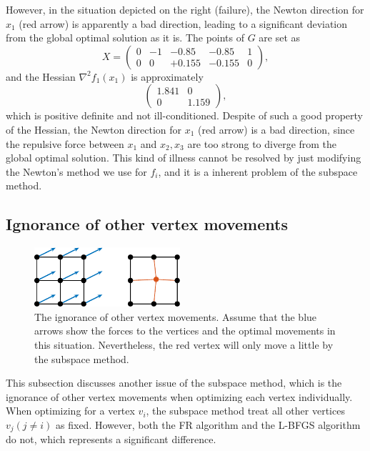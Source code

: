 \documentclass[dvipdfmx,10pt,journal,compsoc]{IEEEtran}
\begin{document}
However, in the situation depicted on the right (failure), the Newton direction for $x_1$ (red arrow) is apparently a bad direction, leading to a significant deviation from the global optimal solution as it is.
The points of $G$ are set as
\begin{equation*}
    X = \begin{pmatrix}
        0 & -1 & -0.85  & -0.85  & 1 \\
        0 & 0  & +0.155 & -0.155 & 0
    \end{pmatrix},
\end{equation*}
and the Hessian $\nabla^2 f_1(x_1)$ is approximately
\begin{equation*}
    \begin{pmatrix}
        1.841 & 0     \\
        0     & 1.159
    \end{pmatrix},
\end{equation*}
which is positive definite and not ill-conditioned.
Despite of such a good property of the Hessian, the Newton direction for $x_1$ (red arrow) is a bad direction, since the repulsive force between $x_1$ and $x_2,x_3$ are too strong to diverge from the global optimal solution.
This kind of illness cannot be resolved by just modifying the Newton's method we use for $f_i$, and it is a inherent problem of the subspace method.

\subsection{Ignorance of other vertex movements}\label{ssec:ignorance}

\begin{figure}[t]
    \centering
    \includegraphics[height=2.2cm]{whyRSNfail2/whyRSNfail2.pdf}
    \caption{
        The ignorance of other vertex movements. Assume that the blue arrows show the forces to the vertices and the optimal movements in this situation. Nevertheless, the red vertex will only move a little by the subspace method.
    }
    \label{fig:whyRSNfail2}
\end{figure}

This subsection discusses another issue of the subspace method, which is the ignorance of other vertex movements when optimizing each vertex individually.
When optimizing for a vertex $v_i$, the subspace method treat all other vertices $v_j (j \neq i)$ as fixed. However, both the FR algorithm and the L-BFGS algorithm do not, which represents a significant difference.
\end{document}
